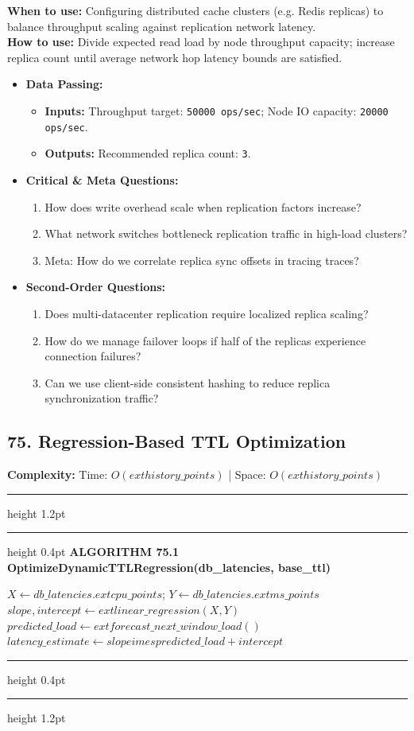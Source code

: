 \documentclass[11pt,a4paper]{article}
\newenvironment{textbookalgo}[2]{%
  \par\addvspace{1.2em}\noindent
  \hrule height 1.2pt
  \vspace{1.5pt}
  \hrule height 0.4pt
  \vspace{5pt}
  {\noindent\large\bfseries\sffamily ALGORITHM #1 \quad #2}
  \par\vspace{5pt}
  \RestyleAlgo{plain}
}{%
  \par\vspace{4pt}
  \hrule height 0.4pt
  \vspace{1.5pt}
  \hrule height 1.2pt
  \par\addvspace{1.2em}
}
\theoremstyle{definition}
\begin{document}
\noindent
\textbf{When to use:} Configuring distributed cache clusters (e.g. Redis replicas) to balance throughput scaling against replication network latency.\\
\textbf{How to use:} Divide expected read load by node throughput capacity; increase replica count until average network hop latency bounds are satisfied.
\begin{itemize}[leftmargin=*]
  \item[] \textbf{Data Passing:}
    \begin{itemize}
      \item \textbf{Inputs:} Throughput target: \texttt{50000 ops/sec}; Node IO capacity: \texttt{20000 ops/sec}.
      \item \textbf{Outputs:} Recommended replica count: \texttt{3}.
    \end{itemize}
  \item[] \textbf{Critical \& Meta Questions:}
  \begin{enumerate}
    \item How does write overhead scale when replication factors increase?
    \item What network switches bottleneck replication traffic in high-load clusters?
    \item Meta: How do we correlate replica sync offsets in tracing traces?
  \end{enumerate}
  \item[] \textbf{Second-Order Questions:}
  \begin{enumerate}
    \item Does multi-datacenter replication require localized replica scaling?
    \item How do we manage failover loops if half of the replicas experience connection failures?
    \item Can we use client-side consistent hashing to reduce replica synchronization traffic?
  \end{enumerate}
\end{itemize}
\medskip

\clearpage
\subsection{75. Regression-Based TTL Optimization}


\noindent
\textbf{Complexity:} Time: $O(	ext{history\_points})$ | Space: $O(	ext{history\_points})$
\smallskip

\begin{textbookalgo}{75.1}{OptimizeDynamicTTLRegression(db\_latencies, base\_ttl)}
\begin{algorithm}[H]
$X \leftarrow db\_latencies.	ext{cpu\_points}$; $Y \leftarrow db\_latencies.	ext{ms\_points}$\;
$slope, intercept \leftarrow 	ext{linear\_regression}(X, Y)$\;
$predicted\_load \leftarrow 	ext{forecast\_next\_window\_load}()$\;
$latency\_estimate \leftarrow slope 	imes predicted\_load + intercept$\;
\end{algorithm}
\end{textbookalgo}
\end{document}
